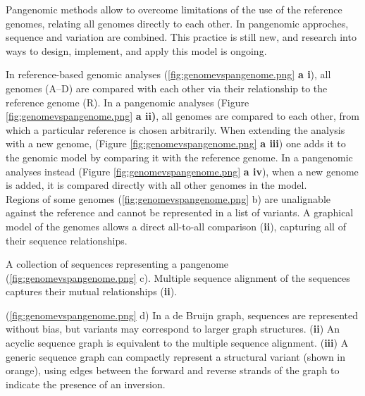 Pangenomic methods allow to overcome limitations of the use of the reference genomes, relating all genomes directly to each other. In pangenomic approches, sequence and variation are combined. This practice is still new, and research into ways to design, implement, and apply this model is ongoing. \\ \cite{eizenga2020pangenome} 

In reference-based genomic analyses (\ref{fig:genomevspangenome.png} \textbf{a i}), all genomes (A–D) are compared with each other via their relationship to the reference genome (R).
In a pangenomic analyses (Figure \ref{fig:genomevspangenome.png} \textbf{a ii)},  all genomes are compared to each other, from which a particular reference is chosen arbitrarily. 
When extending the analysis with a new genome, (Figure \ref{fig:genomevspangenome.png} \textbf{a iii}) one adds it to the genomic model by comparing it with the reference genome.
In a pangenomic analyses instead (Figure \ref{fig:genomevspangenome.png} \textbf{a iv}), when a new genome is added, it is compared directly with all other genomes in the model.\\
 
 
Regions of some genomes (\ref{fig:genomevspangenome.png} b) are unalignable against the reference and cannot be represented in a list of variants. A graphical model of the genomes allows a direct all-to-all comparison (\textbf{ii}), capturing all of their sequence relationships.

A collection of sequences representing a pangenome (\ref{fig:genomevspangenome.png} c). Multiple sequence alignment of the sequences captures their mutual relationships (\textbf{ii}).

(\ref{fig:genomevspangenome.png} d) In a de Bruijn graph, sequences are represented without bias, but variants may
correspond to larger graph structures. (\textbf{ii}) An acyclic sequence graph is equivalent to the multiple sequence alignment. (\textbf{iii}) A generic sequence graph can compactly represent a structural variant (shown in orange), using edges between the forward and reverse strands of
the graph to indicate the presence of an inversion.


